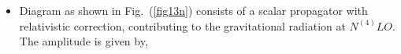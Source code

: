 \begin{itemize}
\item Diagram as shown in Fig.~(\ref{fig13n}) consists of a scalar propagator with relativistic correction, contributing to the gravitational radiation at $N^{(4)}LO.$ The amplitude is given by, 

\end{itemize}
